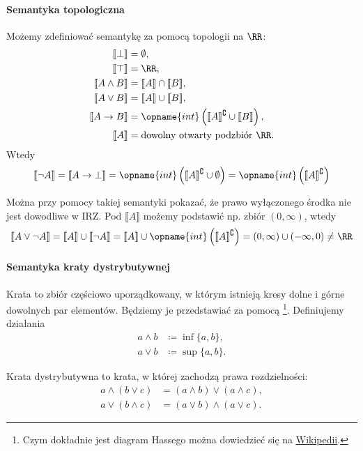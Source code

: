 \documentclass[polish,pretty,bibliography=totocnumbered]{angav}
\begin{document}
\paragraph{Semantyka topologiczna}
Możemy zdefiniować semantykę za pomocą topologii na $\RR$:
\begin{align*}
    \llbracket \bot \rrbracket &= \emptyset, \\
    \llbracket \top \rrbracket &= \RR, \\
    \llbracket A \land B \rrbracket &= \llbracket A \rrbracket \cap \llbracket B \rrbracket, \\
    \llbracket A \lor B \rrbracket &= \llbracket A \rrbracket \cup \llbracket B \rrbracket, \\
    \llbracket A \to B \rrbracket &= \opname{int}\left(\llbracket A \rrbracket^\complement \cup \llbracket B \rrbracket\right), \\
    \llbracket A \rrbracket &= \text{dowolny otwarty podzbiór $\RR$.}
\end{align*}
Wtedy
\[ \llbracket \neg A \rrbracket = \llbracket A \to \bot \rrbracket = \opname{int}\left(\llbracket A \rrbracket^\complement \cup \emptyset\right) = \opname{int}\left(\llbracket A \rrbracket^\complement\right) \]

Można przy pomocy takiej semantyki pokazać, że prawo wyłączonego środka nie jest dowodliwe w IRZ. Pod $\llbracket A \rrbracket$ możemy podstawić np. zbiór $(0, \infty)$, wtedy
\[ \llbracket A \lor \neg A \rrbracket = \llbracket A \rrbracket \cup \llbracket \neg A \rrbracket = \llbracket A \rrbracket \cup \opname{int}\left(\llbracket A \rrbracket^\complement\right) = (0, \infty) \cup (-\infty, 0) \neq \RR \]

\paragraph{Semantyka kraty dystrybutywnej}
Krata to zbiór częściowo uporządkowany, w którym istnieją kresy dolne i górne dowolnych par elementów.
Będziemy je przedstawiać za pomocą \footnote{Czym dokładnie jest diagram Hassego można dowiedzieć się na \href{https://pl.wikipedia.org/wiki/Diagram_Hassego}{Wikipedii}.}.
Definiujemy działania
\begin{align*}
    a \land b &\coloneqq \inf\{a, b\}, \\
    a \lor b &\coloneqq \sup\{a, b\}.
\end{align*}

Krata dystrybutywna to krata, w której zachodzą prawa rozdzielności:
\begin{align*}
    a \land (b \lor c) &= (a \land b) \lor (a \land c), \\
    a \lor (b \land c) &= (a \lor b) \land (a \lor c).
\end{align*}
\end{document}
